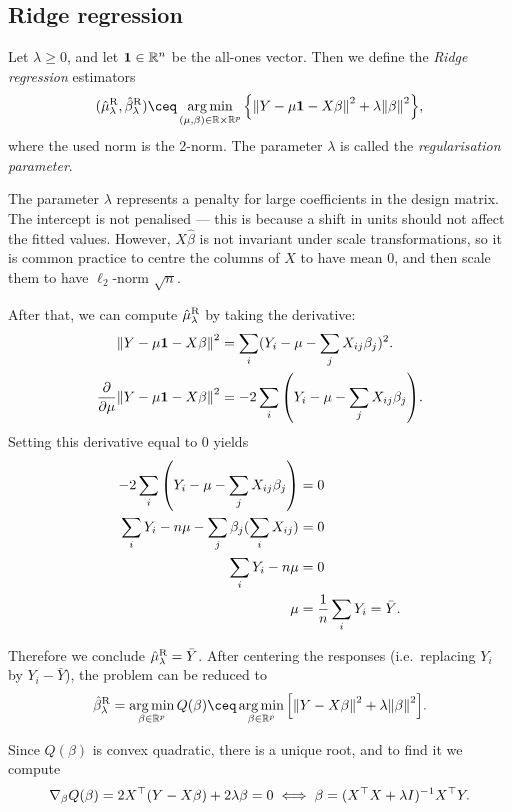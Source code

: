 \subsection{Ridge regression}
\begin{definition}
    Let $\lambda \geq 0$, and let $\mathbf 1 \in \mathbb R^n$ be the all-ones vector. Then we define the \emph{Ridge regression} estimators
    \[
    (\hat\mu_\lambda^\Rm{R}, \hat\beta_\lambda^\Rm{R}) \ceq \argmin_{(\mu, \beta) \in \RR \times \RR^p} \qty{ \norm{Y - \mu\Bf 1 - X\beta}^2 + \lambda \norm{\beta}^2}, 
    \]
    where the used norm is the 2-norm. The parameter $\lambda$ is called the \emph{regularisation parameter}. 
\end{definition}

The parameter $\lambda$ represents a penalty for large coefficients in the design matrix. The intercept is not penalised --- this is because a shift in units should not affect the fitted values. However, $X\hat\beta$ is not invariant under scale transformations, so it is common practice to centre the columns of $X$ to have mean 0, and then scale them to have $\ell_2$-norm $\sqrt n$. 

After that, we can compute $\hat\mu_\lambda^\mathrm{R}$ by taking the derivative:  
\begin{align*}
    \norm{Y - \mu\mathbf{1} - X\beta}^2 &=  \sum_i (Y_i - \mu - \sum_j X_{ij}\beta_j)^2. \\
    \pdv{\mu} \norm{Y- \mu\mathbf{1} - X\beta}^2 &= -2 \sum_i \qty( Y_i - \mu - \sum_j X_{ij}\beta_j).
\end{align*}
Setting this derivative equal to 0 yields
\begin{align*}
    -2\sum_i \qty(Y_i - \mu - \sum_j X_{ij}\beta_j) &= 0 \\
    \sum_i Y_i - n\mu - \sum_j \beta_j (\sum_i X_{ij}) &= 0 \\
    \sum_i Y_i - n\mu &= 0 \\
    \mu &= \frac1n \sum_i Y_i = \bar Y. 
\end{align*}

Therefore we conclude $\hat\mu_\lambda^{\mathrm R} = \bar Y$. 
After centering the responses (i.e.\, replacing $Y_i$ by $Y_i - \bar Y$), the problem can be reduced to 
\[
\hat\beta_\lambda^{\Rm R} = \argmin_{\beta \in \RR^p} Q(\beta) \ceq \argmin_{\beta \in \RR^p}  \qty[ \norm{Y- X\beta}^2 + \lambda \norm{\beta}^2]. 
\]

Since $Q(\beta)$ is convex quadratic, there is a unique root, and to find it we compute
\[
\nabla_\beta Q(\beta) = 2 X^\top (Y - X \beta) + 2\lambda\beta = 0 \iff \beta = (X^\top X + \lambda I)^{-1} X^\top Y. 
\]

